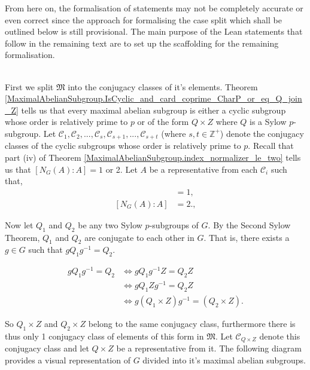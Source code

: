 \begin{footnotesize}
\begin{remark}
  From here on, the formalisation of statements may not be completely accurate or even correct since the approach for formalising the case split
  which shall be outlined below is still provisional. The main purpose of the Lean statements that follow in the remaining text are to set up the scaffolding for
  the remaining formalisation.
\end{remark}
\\
First we split $\mathfrak{M}$ into the conjugacy classes of it's elements. Theorem \ref{MaximalAbelianSubgroup.IsCyclic_and_card_coprime_CharP_or_eq_Q_join_Z} tells us that every maximal abelian subgroup is either a cyclic subgroup whose order is relatively prime to $p$ or of the form $Q \times Z$ where $Q$ is a Sylow $p$-subgroup. Let $\mathcal{C}_1, \mathcal{C}_2,...,\mathcal{C}_s, \mathcal{C}_{s+1},..., \mathcal{C}_{s+t}$ (where $s, t \in \mathbb{Z}^+$) denote the conjugacy classes of the cyclic subgroups whose order is relatively prime to $p$. Recall that part (iv) of Theorem \ref{MaximalAbelianSubgroup.index_normalizer_le_two} tells us that $[N_G(A): A] = 1$ or 2. Let $A$ be a representative from each $\mathcal{C}_i$ such that,
\begin{align*} [N_G(A) : A] &= 1, \tag{for  $i \leq s$} \\[2mm]
[N_G(A) : A] &= 2. \tag{for  $s < i \leq s+t$}, \end{align*}

Now let $Q_1$ and $Q_2$ be any two Sylow $p$-subgroups of $G$. By the Second Sylow Theorem, $Q_1$ and $Q_2$ are conjugate to each other in $G$. That is, there exists a $g \in G$ such that $gQ_1g^{-1} = Q_2$.

\begin{align*} gQ_1g^{-1} = Q_2 &\iff gQ_1g^{-1}Z = Q_2Z 
\\ &\iff gQ_1Zg^{-1} = Q_2Z
\\ &\iff g(Q_1 \times Z)g^{-1} = (Q_2 \times Z). %
\end{align*} 

So $Q_1 \times Z$ and $Q_2 \times Z$ belong to the same conjugacy class, furthermore there is thus only 1 conjugacy class of elements of this form in $\mathfrak{M}$. Let $\mathcal{C}_{Q \times Z}$ denote this conjugacy class and let $Q \times Z$ be a representative from it. The following diagram provides a visual representation of $G$ divided into it's maximal abelian subgroups.



\end{footnotesize}
